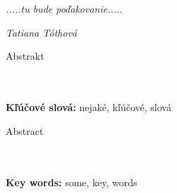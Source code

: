\documentclass[a4paper,12pt,openany,oneside,header=optiontohead]{scrbook} %
\def\mfauthor{Tatiana Tóthová}
\begin{document}
\pagestyle{plain}

{~}\vspace{12cm}

\noindent
\begin{minipage}{0.25\textwidth}~\end{minipage}
\begin{center}
\begin{minipage}{1\textwidth}
\textit{.....tu bude poďakovanie.....}
\end{minipage}
\end{center}
\hfill\textit{\mfauthor}
\vfill\eject %


\noindent
\begin{center}
\begin{minipage}{1\textwidth}
\centerline{\large Abstrakt}

\\ \\ 
{\bf Kľúčové slová:} nejaké, kľúčové, slová
\end{minipage}
\end{center}
\eject %

\noindent
\begin{center}
\begin{minipage}{1\textwidth}
\centerline{\large Abstract} 

\\ \\
{\bf Key words:} some, key, words
\end{minipage}
\end{center}
\eject %

\tableofcontents

\mainmatter
\pagestyle{fancy}







\backmatter

{}
{}
\nocite{*}


\end{document}
